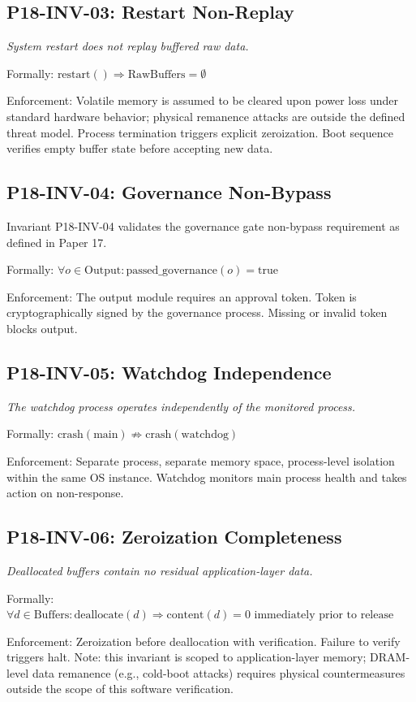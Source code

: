 \documentclass[conference]{IEEEtran}
\begin{document}
\subsection{P18-INV-03: Restart Non-Replay}
\textit{System restart does not replay buffered raw data.}

Formally: $\text{restart}() \Rightarrow \text{RawBuffers} = \emptyset$

Enforcement: Volatile memory is assumed to be cleared upon power loss under standard hardware behavior; physical remanence attacks are outside the defined threat model. Process termination triggers explicit zeroization. Boot sequence verifies empty buffer state before accepting new data.

\subsection{P18-INV-04: Governance Non-Bypass}
Invariant P18-INV-04 validates the governance gate non-bypass requirement as defined in Paper 17.

Formally: $\forall o \in \text{Output}: \text{passed\_governance}(o) = \text{true}$

Enforcement: The output module requires an approval token. Token is cryptographically signed by the governance process. Missing or invalid token blocks output.

\subsection{P18-INV-05: Watchdog Independence}
\textit{The watchdog process operates independently of the monitored process.}

Formally: $\text{crash}(\text{main}) \not\Rightarrow \text{crash}(\text{watchdog})$

Enforcement: Separate process, separate memory space, process-level isolation within the same OS instance. Watchdog monitors main process health and takes action on non-response.

\subsection{P18-INV-06: Zeroization Completeness}
\textit{Deallocated buffers contain no residual application-layer data.}

Formally: $\forall d \in \text{Buffers}: \text{deallocate}(d) \Rightarrow \text{content}(d) = 0 \text{ immediately prior to release}$

Enforcement: Zeroization before deallocation with verification. Failure to verify triggers halt. Note: this invariant is scoped to application-layer memory; DRAM-level data remanence (e.g., cold-boot attacks) requires physical countermeasures outside the scope of this software verification.
\end{document}

